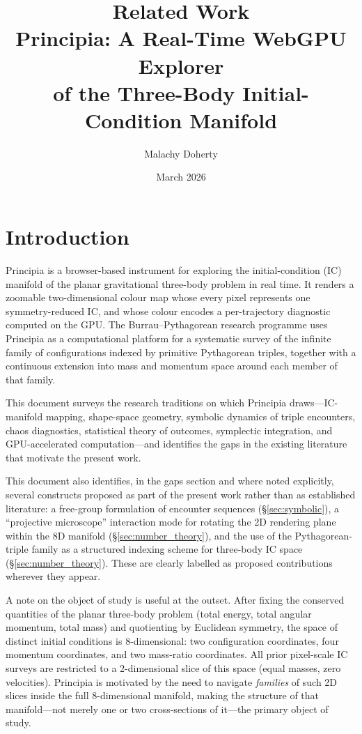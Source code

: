 \documentclass[11pt,a4paper]{article}
\title{\textbf{Related Work}\\[0.8ex]
\large Principia: A Real-Time WebGPU Explorer\\
of the Three-Body Initial-Condition Manifold}
\author{Malachy Doherty}
\date{March 2026}
\begin{document}
\maketitle
\tableofcontents
\vspace{1em}

\section{Introduction}

Principia is a browser-based instrument for exploring the initial-condition (IC) manifold of
the planar gravitational three-body problem in real time.  It renders a zoomable
two-dimensional colour map whose every pixel represents one symmetry-reduced IC, and whose
colour encodes a per-trajectory diagnostic computed on the GPU.  The Burrau--Pythagorean
research programme uses Principia as a computational platform for a systematic survey of the
infinite family of configurations indexed by primitive Pythagorean triples, together with a
continuous extension into mass and momentum space around each member of that family.

This document surveys the research traditions on which Principia draws---IC-manifold mapping,
shape-space geometry, symbolic dynamics of triple encounters, chaos diagnostics, statistical
theory of outcomes, symplectic integration, and GPU-accelerated computation---and identifies
the gaps in the existing literature that motivate the present work.

This document also identifies, in the gaps section and where noted explicitly, several
constructs proposed as part of the present work rather than as established literature: a
free-group formulation of encounter sequences (\S\ref{sec:symbolic}), a ``projective
microscope'' interaction mode for rotating the 2D rendering plane within the 8D manifold
(\S\ref{sec:number_theory}), and the use of the Pythagorean-triple family as a structured
indexing scheme for three-body IC space (\S\ref{sec:number_theory}).  These are clearly
labelled as proposed contributions wherever they appear.

A note on the object of study is useful at the outset.  After fixing the conserved quantities
of the planar three-body problem (total energy, total angular momentum, total mass) and quotienting
by Euclidean symmetry, the space of distinct initial conditions is 8-dimensional: two configuration
coordinates, four momentum coordinates, and two mass-ratio coordinates.  All prior pixel-scale IC
surveys are restricted to a 2-dimensional slice of this space (equal masses, zero velocities).
Principia is motivated by the need to navigate \emph{families} of such 2D slices inside the full
8-dimensional manifold, making the structure of that manifold---not merely one or two cross-sections
of it---the primary object of study.
\end{document}
